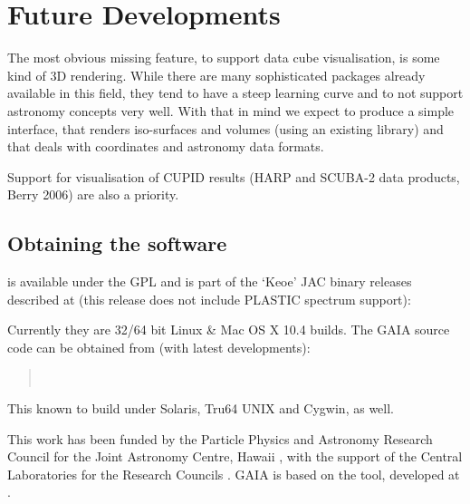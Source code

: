 \documentclass[11pt,twoside]{article}  %
\begin{document}
%

\section{Future Developments}

The most obvious missing feature, to support data cube visualisation, is some
kind of 3D rendering. While there are many sophisticated packages already
available in this field, they tend to have a steep learning curve and to
not support astronomy concepts very well. With that in mind we expect to
produce a simple interface, that renders iso-surfaces and volumes (using an
existing library) and that deals with coordinates and astronomy data formats.

Support for visualisation of CUPID results (HARP and SCUBA-2 data products,
Berry 2006) are also a priority.

\subsection{Obtaining the software}

is available under the GPL and is part of the `Keoe' JAC binary releases
described at (this release does not include PLASTIC spectrum support):
\begin{quote}
\end{quote}
Currently they are 32/64 bit Linux \& Mac OS X 10.4 builds.
The GAIA source code can be obtained from (with latest developments):
\begin{quote}
 \\
\end{quote}
This known to build under Solaris, Tru64 UNIX and Cygwin, as well.

\acknowledgments

This work has been funded by the Particle Physics and Astronomy Research
Council 
for the Joint Astronomy Centre, Hawaii 
, 
with the support
of the Central Laboratories for the Research Councils 
. 
GAIA is based on the 
tool, developed at 
.
\end{document}
